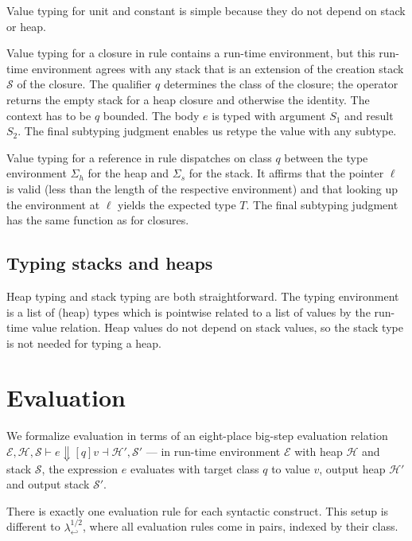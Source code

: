 \documentclass[sigplan,review,dvipsnames,screen,10pt]{acmart}
\newcommand{\LamWhatif}{\ensuremath{\lambda^{1/2}_{\hookleftarrow}}}
\begin{document}
Value typing for unit and constant is simple because they do not
depend on stack or heap.

Value typing for a closure in rule {\ACTVClos} contains a run-time
environment, but this run-time environment agrees with any stack that
is an extension of the creation stack $\mathcal{S}$ of the
closure. The qualifier $q$ determines the class of the closure; the
 operator returns the empty stack for a heap closure
and otherwise the identity.
The context has to be $q$ bounded.
The body $e$ is typed with argument $S_1$ and result $S_2$.
The final subtyping judgment enables us retype the value with any
subtype.

Value typing for a reference in rule {\ACTVRef} dispatches on class
$q$ between the type environment $\Sigma_h$ for the heap and
$\Sigma_s$ for the stack. It affirms that the pointer $\ell$ is valid
(less than the length of the respective environment) and that looking
up the environment at $\ell$ yields the expected type $T$.
The final subtyping judgment has the same function as for closures.

\subsection{Typing stacks and heaps }
\label{sec:typing-stacks-heaps}

Heap typing and stack typing are both straightforward. The typing
environment is a list of (heap) types which is pointwise related to a
list of values by the run-time value relation. Heap values do not
depend on stack values, so the stack type is not needed for typing a heap.

\HeapTyping
\StackTyping


\section{Evaluation}
\label{sec:evaluation}

We formalize evaluation in terms of an eight-place big-step evaluation
relation
$\mathcal{E}, \mathcal{H}, \mathcal{S} \vdash e \Downarrow{[ q ]} v
\dashv \mathcal{H}', \mathcal{S}'$ ---
in run-time environment $\mathcal{E}$ with heap $\mathcal{H}$ and
stack $\mathcal{S}$, the expression $e$ evaluates with target class
$q$ to value $v$, output heap $\mathcal{H}'$ and output stack
$\mathcal{S}'$.

There is exactly one evaluation rule for each
syntactic construct. This setup is different to $\LamWhatif$, where
all evaluation rules come in pairs, indexed by their class.
\end{document}
